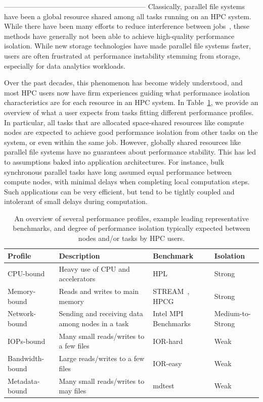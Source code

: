   
 ------------------------------------------------------------ 
Classically, parallel file systems have been a global resource shared among all tasks running on an HPC system. While there have been many efforts to reduce interference between jobs~\cite{10.1145/2063384.2063407,7573843}, these methods have generally not been able to achieve high-quality performance isolation. While new storage technologies have made parallel file systems faster, users are often frustrated at performance instability stemming from storage, especially for data analytics workloads.

Over the past decades, this phenomenon has become widely understood, and most HPC users now have firm experiences guiding what performance isolation characteristics are for each resource in an HPC system. In Table~\ref{Table:profiles}, we provide an overview of what a user expects from tasks fitting different performance profiles. In particular, all tasks that are allocated space-shared resources like compute nodes are expected to achieve good performance isolation from other tasks on the system, or even within the same job. However, globally shared resources like parallel file systems have no guarantees about performance stability. This has led to assumptions baked into application architectures. For instance, bulk synchronous parallel tasks have long assumed equal performance between compute nodes, with minimal delays when completing local computation steps. Such applications can be very efficient, but tend to be tightly coupled and intolerant of small delays during computation.

\begin{table}
  \caption{An overview of several performance profiles, example leading representative benchmarks, and degree of performance isolation typically expected between nodes and/or tasks by HPC users.}
  \label{Table:profiles}
  \begin{center}
\begin{tabular}{|l|l|l|l|}
\hline
{\bf Profile} & {\bf Description} & {\bf Benchmark} & {\bf Isolation} \\
\hline
CPU-bound & Heavy use of CPU and accelerators & HPL~\cite{hpl} & Strong\\
\hline
Memory-bound & Reads and writes to main memory & \raggedright STREAM~\cite{stream}, HPCG~\cite{hpcg} & Strong\\
\hline
Network-bound & Sending and receiving data among nodes in a task & \raggedright Intel MPI Benchmarks~\cite{imb} & Medium-to-Strong\\
\hline
IOPs-bound & Many small reads/writes to a few files & IOR-hard~\cite{io500} & Weak\\
\hline
Bandwidth-bound & Large reads/writes to a few files & IOR-easy~\cite{io500} & Weak\\
\hline
Metadata-bound & Many small reads/writes to may files & mdtest~\cite{ior} & Weak \\
\hline
\end{tabular}
\end{center}
\end{table}

